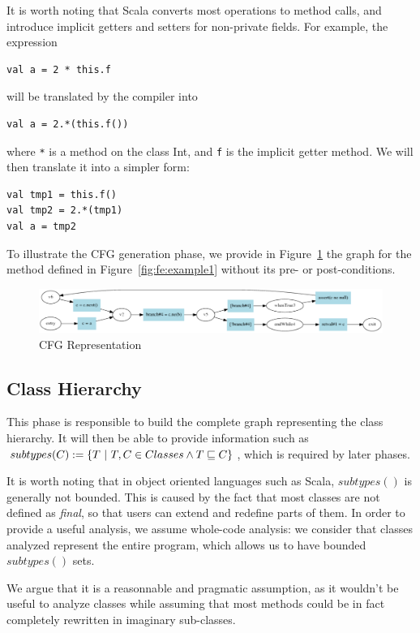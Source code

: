 It is worth noting that Scala converts most operations to method calls, and
introduce implicit getters and setters for non-private fields. For example,
the expression 
\begin{lstlisting}
val a = 2 * this.f
\end{lstlisting}
will be translated by the compiler into 
\begin{lstlisting}
val a = 2.*(this.f())
\end{lstlisting}
where \verb/*/ is a method on the class Int, and \verb/f/ is the implicit
getter method. We will then translate it into a simpler form:
\begin{lstlisting}
val tmp1 = this.f()
val tmp2 = 2.*(tmp1)
val a = tmp2
\end{lstlisting}


To illustrate the CFG generation phase, we provide in
Figure~\ref{fig:cfg:example1} the graph for the method defined in
Figure~\ref{fig:fe:example1} without its pre- or post-conditions.

\begin{figure}[h]
    \centering

    \includegraphics[scale=0.40]{images/cfg_example1}

    \caption{CFG Representation}
    \label{fig:cfg:example1}
\end{figure}

\subsection{Class Hierarchy}
This phase is responsible to build the complete graph representing the class
hierarchy. It will then be able to provide information such as $subtypes(C)
:= \{ T ~|~ T,C \in Classes \land T \sqsubseteq C \}$, which is required by later phases.

It is worth noting that in object oriented languages such as Scala,
$subtypes()$ is generally not bounded. This is caused by the fact that most
classes are not defined as \emph{final}, so that users can extend and redefine
parts of them. In order to provide a useful analysis, we assume
whole-code analysis: we consider that classes analyzed represent the entire
program, which allows us to have bounded $subtypes()$ sets.

We argue that it is a reasonnable and pragmatic assumption, as it wouldn't be
useful to analyze classes while assuming that most methods could be in fact
completely rewritten in imaginary sub-classes.
